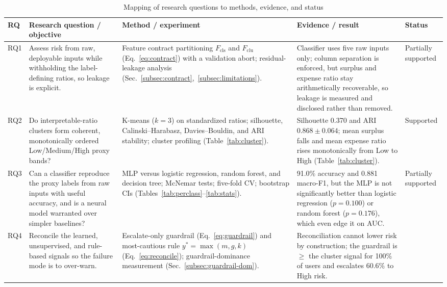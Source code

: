 \begin{table}[t]
\centering
\caption{Mapping of research questions to methods, evidence, and status}
\label{tab:rqmap}
\footnotesize
\setlength{\tabcolsep}{5pt}
\renewcommand{\arraystretch}{1.15}
\begin{tabularx}{\textwidth}{@{}>{\centering\arraybackslash}p{0.8cm} L L L >{\raggedright\arraybackslash}p{1.9cm}@{}}
\toprule
RQ & Research question / objective & Method / experiment & Evidence / result & Status \\
\midrule
RQ1 & Assess risk from raw, deployable inputs while withholding the label-defining ratios,
so leakage is explicit. &
Feature contract partitioning $F_{\text{cls}}$ and $F_{\text{clu}}$
(Eq.~\ref{eq:contract}) with a validation abort; residual-leakage analysis
(Sec.~\ref{subsec:contract},~\ref{subsec:limitations}). &
Classifier uses five raw inputs only; column separation is enforced, but surplus and
expense ratio stay arithmetically recoverable, so leakage is measured and disclosed rather
than removed. &
Partially supported \\
\addlinespace
RQ2 & Do interpretable-ratio clusters form coherent, monotonically ordered Low/Medium/High
proxy bands? &
K-means ($k = 3$) on standardized ratios; silhouette, Calinski--Harabasz,
Davies--Bouldin, and ARI stability; cluster profiling (Table~\ref{tab:cluster}). &
Silhouette 0.370 and ARI $0.868 \pm 0.064$; mean surplus falls and mean expense ratio
rises monotonically from Low to High (Table~\ref{tab:cluster}). &
Supported \\
\addlinespace
RQ3 & Can a classifier reproduce the proxy labels from raw inputs with useful accuracy, and
is a neural model warranted over simpler baselines? &
MLP versus logistic regression, random forest, and decision tree; McNemar tests; five-fold
CV; bootstrap CIs (Tables~\ref{tab:perclass}--\ref{tab:stats}). &
91.0\% accuracy and 0.881 macro-F1, but the MLP is not significantly better than logistic
regression ($p = 0.100$) or random forest ($p = 0.176$), which even edge it on AUC. &
Partially supported \\
\addlinespace
RQ4 & Reconcile the learned, unsupervised, and rule-based signals so the failure mode is to
over-warn. &
Escalate-only guardrail (Eq.~\ref{eq:guardrail}) and most-cautious rule
$y^{*} = \max(m, g, k)$ (Eq.~\ref{eq:reconcile}); guardrail-dominance measurement
(Sec.~\ref{subsec:guardrail-dom}). &
Reconciliation cannot lower risk by construction; the guardrail is $\geq$ the cluster
signal for 100\% of users and escalates 60.6\% to High risk. &

\end{tabularx}
\end{table}
